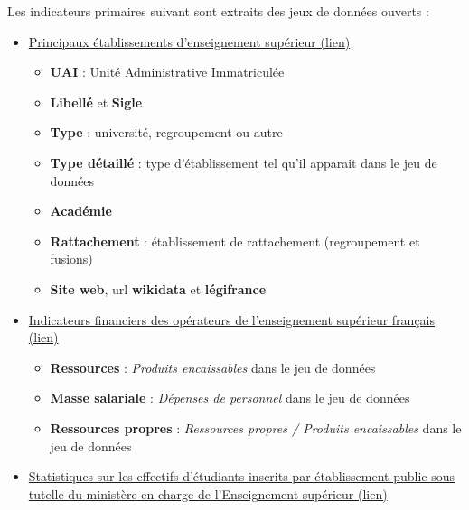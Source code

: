\documentclass[12pt,french,landscape]{article}
\providecommand{\tightlist}{%
  \setlength{\itemsep}{0pt}\setlength{\parskip}{0pt}}
\begin{document}
\begin{multicols}{2}
Les indicateurs primaires suivant sont extraits des jeux de données
ouverts :

\begin{itemize}
\tightlist
\item
  \href{https://data.enseignementsup-recherche.gouv.fr/explore/dataset/fr-esr-principaux-etablissements-enseignement-superieur/}{Principaux
  établissements d'enseignement supérieur (lien)}

  \begin{itemize}
  \tightlist
  \item
    \textbf{UAI} : Unité Administrative Immatriculée
  \item
    \textbf{Libellé} et \textbf{Sigle}
  \item
    \textbf{Type} : université, regroupement ou autre
  \item
    \textbf{Type détaillé} : type d'établissement tel qu'il apparait
    dans le jeu de données
  \item
    \textbf{Académie}
  \item
    \textbf{Rattachement} : établissement de rattachement (regroupement
    et fusions)
  \item
    \textbf{Site web}, url \textbf{wikidata} et \textbf{légifrance}
  \end{itemize}
\item
  \href{https://data.enseignementsup-recherche.gouv.fr/explore/dataset/fr-esr-operateurs-indicateurs-financiers/}{Indicateurs
  financiers des opérateurs de l'enseignement supérieur français (lien)}

  \begin{itemize}
  \tightlist
  \item
    \textbf{Ressources} : \emph{Produits encaissables} dans le jeu de
    données
  \item
    \textbf{Masse salariale} : \emph{Dépenses de personnel} dans le jeu
    de données
  \item
    \textbf{Ressources propres} : \emph{Ressources propres / Produits
    encaissables} dans le jeu de données
  \end{itemize}
\item
  \href{https://data.enseignementsup-recherche.gouv.fr/explore/dataset/fr-esr-statistiques-sur-les-effectifs-d-etudiants-inscrits-par-etablissement/}{Statistiques
  sur les effectifs d'étudiants inscrits par établissement public sous
  tutelle du ministère en charge de l'Enseignement supérieur (lien)}


\end{itemize}
\end{multicols}
\end{document}
